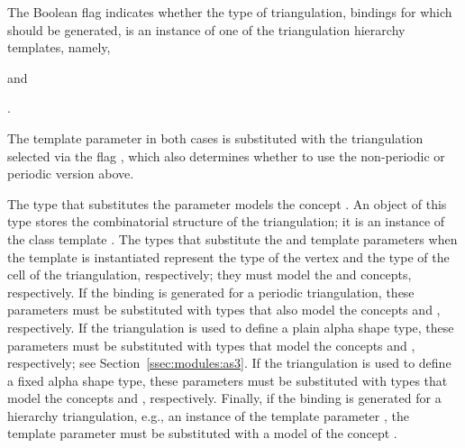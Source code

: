 The \cmake{} Boolean flag  indicates
whether the type of triangulation, bindings for which should be
generated, is an instance of one of the triangulation hierarchy
templates, namely,
\begin{compactitem}
\item {} and
\item {}.
\end{compactitem}
The template parameter in both cases is substituted with the
triangulation selected via the \cmake{} flag
, which also determines whether to use the
non-periodic or periodic version above.

The type that substitutes the  parameter models the
concept . An object of this
type stores the combinatorial structure of the triangulation; it is an
instance of the class template
.
The types that substitute the  and 
template parameters when the
 template
is instantiated represent the type of the vertex and the type of the
cell of the triangulation, respectively; they must model the
 and
 concepts, respectively. If the
binding is generated for a periodic triangulation, these parameters
must be substituted with types that also model the concepts
 and
, respectively.
If the triangulation is used to define a plain alpha shape type, these
parameters must be substituted with types that model the concepts
 and
, respectively; see
Section~\ref{ssec:modules:as3}. If the triangulation is used to define
a fixed alpha shape type, these parameters must be substituted with
types that model the concepts 
and , respectively. Finally, if
the binding is generated for a hierarchy triangulation, e.g., an
instance of the template parameter
, the
 template parameter must be substituted with a model
of the concept .
